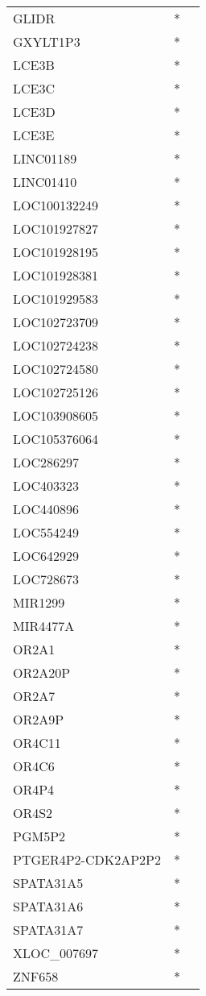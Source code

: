 \begin{longtable}{lcc}
GLIDR              &  * &         \\
GXYLT1P3           &  * &         \\
LCE3B              &  * &         \\
LCE3C              &  * &         \\
LCE3D              &  * &         \\
LCE3E              &  * &         \\
LINC01189          &  * &         \\
LINC01410          &  * &         \\
LOC100132249       &  * &         \\
LOC101927827       &  * &         \\
LOC101928195       &  * &         \\
LOC101928381       &  * &         \\
LOC101929583       &  * &         \\
LOC102723709       &  * &         \\
LOC102724238       &  * &         \\
LOC102724580       &  * &         \\
LOC102725126       &  * &         \\
LOC103908605       &  * &         \\
LOC105376064       &  * &         \\
LOC286297          &  * &         \\
LOC403323          &  * &         \\
LOC440896          &  * &         \\
LOC554249          &  * &         \\
LOC642929          &  * &         \\
LOC728673          &  * &         \\
MIR1299            &  * &         \\
MIR4477A           &  * &         \\
OR2A1              &  * &         \\
OR2A20P            &  * &         \\
OR2A7              &  * &         \\
OR2A9P             &  * &         \\
OR4C11             &  * &         \\
OR4C6              &  * &         \\
OR4P4              &  * &         \\
OR4S2              &  * &         \\
PGM5P2             &  * &         \\
PTGER4P2-CDK2AP2P2 &  * &         \\
SPATA31A5          &  * &         \\
SPATA31A6          &  * &         \\
SPATA31A7          &  * &         \\
XLOC\_007697        &  * &         \\
ZNF658             &  * &         \\
\end{longtable}

